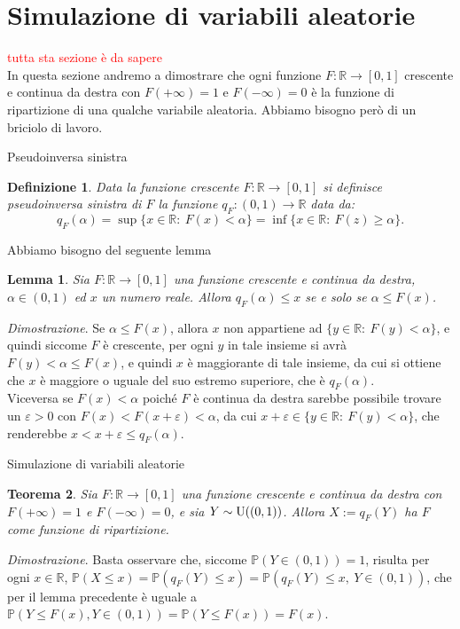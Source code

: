 \documentclass[11pt]{book}
\makeatletter
\theoremstyle{Definizione}
\newtheorem*{mydef}{Definizione}
\theoremstyle{TeoremaProposizioneLemmaCorollario}
\newtheorem{myteo}{Teorema}[section]
\newtheorem{mylem}[myteo]{Lemma}
\theoremstyle{OsservazioneNota}
\renewenvironment{proof}[1][\proofname]{\par
  \normalfont \topsep6\p@\@plus6\p@\relax
  \trivlist
  \item[\hskip\labelsep
        \itshape
    #1\@addpunct{.}]\ignorespaces
}{%
  \endtrivlist\@endpefalse
}
\newcommand{\R}{\mathbb{R}}
\renewcommand{\P}{\mathbb{P}}
\renewenvironment{proof}{\textsl{Dimostrazione}.}{}
\makeatother
\begin{document}
\section{Simulazione di variabili aleatorie}
\textcolor{red}{tutta sta sezione è da sapere}\\
In questa sezione andremo a dimostrare che ogni funzione $F:\R\longrightarrow [0,1]$ crescente e continua da destra con $F(+\infty) = 1$ e $F(-\infty) = 0$ è la funzione di ripartizione di una qualche variabile aleatoria. Abbiamo bisogno però di un briciolo di lavoro.
\begin{boxdef}{Pseudoinversa sinistra}
\begin{mydef}
Data la funzione crescente $F:\R\longrightarrow [0,1]$ si definisce pseudoinversa sinistra di $F$ la funzione $q_F:(0,1)\longrightarrow \R$ data da:
$$
q_F(\alpha) = \sup\{x\in \R:\ F(x) < \alpha\} = \inf\{x\in \R:\ F(z) \geq \alpha\}.
$$
\end{mydef}
\end{boxdef}
\noindent
Abbiamo bisogno del seguente lemma
\begin{boxoss}
\begin{mylem}
Sia $F:\R\longrightarrow[0,1]$ una funzione crescente e continua da destra, $\alpha\in (0,1)$ ed $x$ un numero reale. Allora $q_F(\alpha)\leq x$ se e solo se $\alpha \leq F(x)$.
\end{mylem}
\tcblower
\begin{proof}
Se $\alpha \leq F(x)$, allora $x$ non appartiene ad $\{y\in \R:\ F(y) < \alpha\}$, e quindi siccome $F$ è crescente, per ogni $y$ in tale insieme si avrà $F(y) < \alpha \leq F(x)$, e quindi $x$ è maggiorante di tale insieme, da cui si ottiene che $x$ è maggiore o uguale del suo estremo superiore, che è $q_F(\alpha)$.\\
Viceversa se $F(x) < \alpha$ poiché $F$ è continua da destra sarebbe possibile trovare un $\varepsilon> 0$ con $F(x)< F(x+\varepsilon)< \alpha$, da cui $x+\varepsilon \in \{y\in \R:\ F(y) < \alpha\}$, che renderebbe $x < x+\varepsilon\leq q_F(\alpha)$.
\end{proof}
\end{boxoss}
\noindent
\begin{boxteo}{Simulazione di variabili aleatorie}
\begin{myteo}
Sia $F:\R\longrightarrow [0,1]$ una funzione crescente e continua da destra con $F(+\infty) = 1$ e $F(-\infty) =0$, e sia $Y\sim \textup{U}((0,1))$. Allora $X := q_F(Y)$ ha $F$ come funzione di ripartizione.
\end{myteo}
\tcblower
\begin{proof}
Basta osservare che, siccome $\P(Y\in (0,1)) = 1$, risulta per ogni $x\in \R$, $\P(X \leq x ) = \P(q_F(Y) \leq x) = \P(q_F(Y)\leq x,\ Y\in (0,1))$, che per il lemma precedente è uguale a $\P(Y\leq F(x),Y\in (0,1)) = \P(Y\leq F(x)) = F(x)$.
\end{proof}
\end{boxteo}
\end{document}
